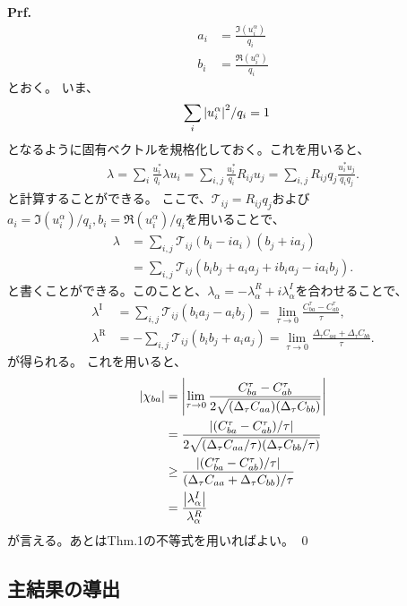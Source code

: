 \documentclass[a4paper,11pt]{jsarticle}
\numberwithin{equation}{section}
\begin{document}
\textbf{Prf.}\\
\begin{align}
    a_{i} &= \frac{\Im(u_{i}^{\alpha})}{q_i} \\
    b_{i} &= \frac{\Re(u_{i}^{\alpha})}{q_i}
\end{align}
とおく。
いま、
\begin{align}
    \sum_{i} \abs{u_{i}^{\alpha}}^2/q_i &=1
\end{align}
となるように固有ベクトルを規格化しておく。これを用いると、
\begin{align}
    \lambda = \sum_i \frac{u_i^*}{q_i} \lambda u_i
= \sum_{i,j} \frac{u_i^*}{q_i} R_{ij} u_j
= \sum_{i,j} R_{ij} q_j \frac{u_i^* u_j}{q_i q_j}.
\end{align}
と計算することができる。
ここで、$\mathcal{T}_{ij} = R_{ij} q_j$および$a_{i}= \Im(u_{i}^{\alpha})/q_i, b_{i} = \Re(u_{i}^{\alpha})/q_i$を用いることで、
\begin{align}
    \lambda &= \sum_{i,j} \mathcal{T}_{ij}(b_i - i a_i)(b_j + i a_j)\\
    &=\sum_{i,j} \mathcal{T}_{ij}(b_i b_j + a_i a_j + i b_i a_j - i a_i b_j).
\end{align}
と書くことができる。このことと、$\lambda_\alpha = -\lambda_\alpha^{R} + i \lambda_\alpha^{I}$を合わせることで、
\begin{align}
    \lambda^{\mathrm{I}}
&= \sum_{i,j} \mathcal{T}_{ij}(b_i a_j - a_i b_j)
= \lim_{\tau \to 0}
\frac{C_{ba}^{\tau} - C_{ab}^{\tau}}{\tau},\\
\lambda^{\mathrm{R}}
&= -\sum_{i,j} \mathcal{T}_{ij}(b_i b_j + a_i a_j)
= \lim_{\tau \to 0}
\frac{\Delta_\tau C_{aa} + \Delta_\tau C_{bb}}{\tau}.
\end{align}
が得られる。
これを用いると、
\begin{align}
    \abs{\chi_{ba}} &= \abs{\lim_{\tau \to 0} \frac{C_{ba}^{\tau} - C_{ab}^{\tau}}{2\sqrt{(\Delta_{\tau}C_{aa})(\Delta_{\tau} C_{bb})}}} \\
    &= \frac{\abs{(C_{ba}^{\tau} - C_{ab}^{\tau})/\tau}}{2\sqrt{(\Delta_{\tau}C_{aa}/\tau)(\Delta_{\tau} C_{bb}/\tau)}} \\
    &\geq \frac{\abs{(C_{ba}^{\tau} - C_{ab}^{\tau})/\tau}}{(\Delta_{\tau}C_{aa}+\Delta_{\tau} C_{bb})/\tau} \\
    &= \frac{\abs{\lambda_{\alpha}^{I}}}{\lambda_{\alpha}^{R}}
\end{align}
が言える。あとはThm.1の不等式を用いればよい。
\qed\\

\subsection{主結果の導出}
\end{document}
